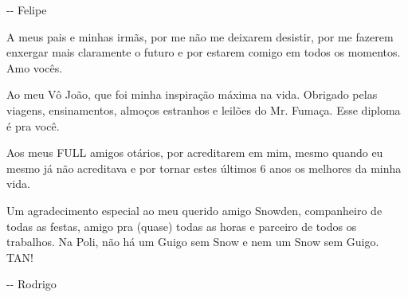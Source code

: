 \documentclass[]{politex}
\begin{document}
\begin{agradecimentos}
\begin{flushright}
	-{}- Felipe
\end{flushright}
	
A meus pais e minhas irmãs, por me não me deixarem desistir, por me fazerem enxergar mais claramente o futuro e por estarem comigo em todos os momentos. Amo vocês.

Ao meu Vô João, que foi minha inspiração máxima na vida. Obrigado pelas viagens, ensinamentos, almoços estranhos e leilões do Mr. Fumaça. Esse diploma é pra você.

Aos meus FULL amigos otários, por acreditarem em mim, mesmo quando eu mesmo já não acreditava e por tornar estes últimos 6 anos os melhores da minha vida.

Um agradecimento especial ao meu querido amigo Snowden, companheiro de todas as festas, amigo pra (quase) todas as horas e parceiro de todos os trabalhos. Na Poli, não há um Guigo sem Snow e nem um Snow sem Guigo. TAN!

\begin{flushright}
	-{}- Rodrigo
\end{flushright}
\end{agradecimentos}


\end{document}
